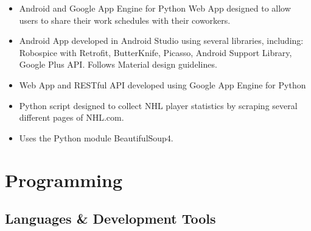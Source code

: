 \documentclass[11pt,letterpaper,sans]{moderncv}        %
\begin{document}
{
  \begin{itemize}
    \item Android and Google App Engine for Python Web App designed to allow users to share their work schedules with their coworkers.
    \item Android App developed in Android Studio using several libraries, including: Robospice with Retrofit, ButterKnife, Picasso, Android Support Library, Google Plus API. Follows Material design guidelines.
    \item Web App and RESTful API developed using Google App Engine for Python
  \end{itemize}
}

{
  \begin{itemize}
    \item Python script designed to collect NHL player statistics by scraping several different pages of NHL.com.
    \item Uses the Python module BeautifulSoup4.
  \end{itemize}
}


\vspace*{-0.5cm} %
\section{Programming}
\subsection{Languages \& Development Tools}

\end{document}
